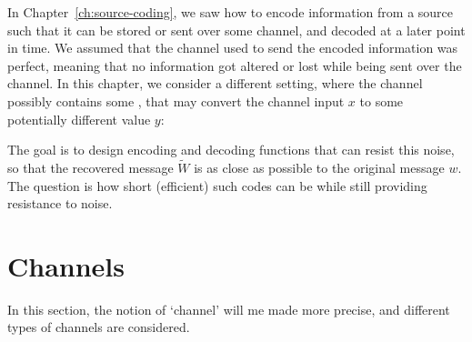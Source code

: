 In Chapter~\ref{ch:source-coding}, we saw how to encode information from a source such that it can be stored or sent over some channel, and decoded at a later point in time. We assumed that the channel used to send the encoded information was perfect, meaning that no information got altered or lost while being sent over the channel. In this chapter, we consider a different setting, where the channel possibly contains some , that may convert the channel input $x$ to some potentially different value $y$:

\begin{figure}[h]
\begin{center}
\end{center}
\end{figure}
The goal is to design encoding and decoding functions that can resist this noise, so that the recovered message $\tilde{W}$ is as close as possible to the original message $w$. The question is how short (efficient) such codes can be while still providing resistance to noise.

\section{Channels}\label{sec:noisy-channel}
In this section, the notion of `channel' will me made more precise, and different types of channels are considered.

